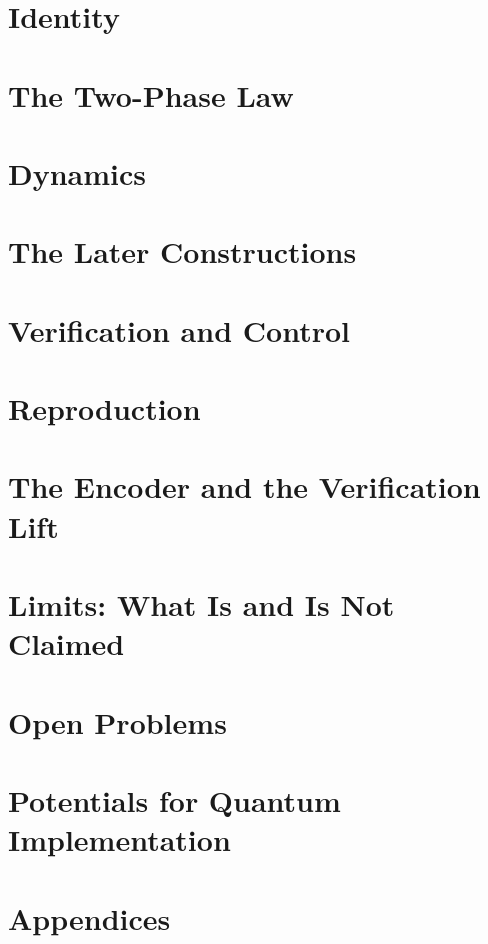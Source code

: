 \documentclass[11pt,openany]{book}
\begin{document}
\part{Identity}


\part{The Two-Phase Law}


\part{Dynamics}


\part{The Later Constructions}


\part{Verification and Control}


\part{Reproduction}


\part{The Encoder and the Verification Lift}


\part{Limits: What Is and Is Not Claimed}


\part{Open Problems}


\part{Potentials for Quantum Implementation}


\appendix
\part*{Appendices}




\backmatter


\end{document}
